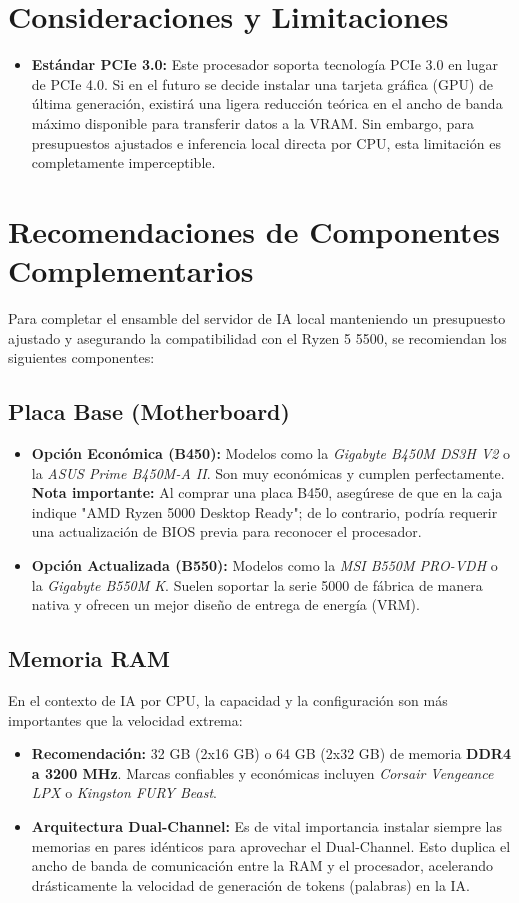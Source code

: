 \documentclass[12pt,a4paper]{article}
\begin{document}
\section{Consideraciones y Limitaciones}
\begin{itemize}
    \item \textbf{Estándar PCIe 3.0:} Este procesador soporta tecnología PCIe 3.0 en lugar de PCIe 4.0. Si en el futuro se decide instalar una tarjeta gráfica (GPU) de última generación, existirá una ligera reducción teórica en el ancho de banda máximo disponible para transferir datos a la VRAM. Sin embargo, para presupuestos ajustados e inferencia local directa por CPU, esta limitación es completamente imperceptible.
\end{itemize}

\section{Recomendaciones de Componentes Complementarios}
Para completar el ensamble del servidor de IA local manteniendo un presupuesto ajustado y asegurando la compatibilidad con el Ryzen 5 5500, se recomiendan los siguientes componentes:

\subsection{Placa Base (Motherboard)}
\begin{itemize}
    \item \textbf{Opción Económica (B450):} Modelos como la \textit{Gigabyte B450M DS3H V2} o la \textit{ASUS Prime B450M-A II}. Son muy económicas y cumplen perfectamente. \textbf{Nota importante:} Al comprar una placa B450, asegúrese de que en la caja indique "AMD Ryzen 5000 Desktop Ready"; de lo contrario, podría requerir una actualización de BIOS previa para reconocer el procesador.
    \item \textbf{Opción Actualizada (B550):} Modelos como la \textit{MSI B550M PRO-VDH} o la \textit{Gigabyte B550M K}. Suelen soportar la serie 5000 de fábrica de manera nativa y ofrecen un mejor diseño de entrega de energía (VRM).
\end{itemize}

\subsection{Memoria RAM}
En el contexto de IA por CPU, la capacidad y la configuración son más importantes que la velocidad extrema:
\begin{itemize}
    \item \textbf{Recomendación:} 32 GB (2x16 GB) o 64 GB (2x32 GB) de memoria \textbf{DDR4 a 3200 MHz}. Marcas confiables y económicas incluyen \textit{Corsair Vengeance LPX} o \textit{Kingston FURY Beast}.
    \item \textbf{Arquitectura Dual-Channel:} Es de vital importancia instalar siempre las memorias en pares idénticos para aprovechar el Dual-Channel. Esto duplica el ancho de banda de comunicación entre la RAM y el procesador, acelerando drásticamente la velocidad de generación de tokens (palabras) en la IA.
\end{itemize}
\end{document}
